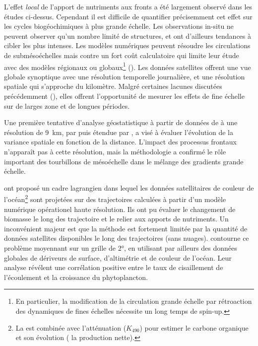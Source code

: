 
L'effet \emph{local} de l'apport de nutriments aux fronts a été largement observé dans les études ci-dessus.
Cependant il est difficile de quantifier précisemment cet effet sur les cycles biogéochimiques à plus grande échelle.
Les observations in-situ ne peuvent observer qu'un nombre limité de structures, et ont d'ailleurs tendances à cibler les plus intenses.
Les modèles numériques peuvent résoudre les circulations de submésoéchelles mais contre un fort coût calculatoire qui limite leur étude avec des modèles régionaux ou globaux\footnote{%
  En particulier, la modification de la circulation grande échelle par rétroaction des dynamiques de fines échelles nécessite un long temps de spin-up.
} (\cite{kessouri_2020,hewitt_2022}).
Les données satellites offrent une vue globale synoptique avec une résolution temporelle journalière, et une résolution spatiale qui s'approche du kilomètre.
Malgré certaines lacunes discutées précédemment (), elles offrent l'opportunité de mesurer les effets de fine échelle sur de larges zone et de longues périodes.

Une première tentative d'analyse géostatistique à partir de données de  à une résolution de \qty{9}{\km}, par \textcite{doney_2003} puis étendue par \textcite{glover_2018}, a visé à évaluer l'évolution de la variance spatiale en fonction de la distance.
L'impact des processus frontaux n'apparaît pas à cette résolution, mais la méthodologie a confirmé le rôle important des tourbillons de mésoéchelle dans le mélange des gradients grande échelle.

\Textcite{jonsson_2011} ont proposé un cadre lagrangien dans lequel les données satellitaires de couleur de l'océan\footnote{%
  La  est combinée avec l'atténuation (\(K_{490}\)) pour estimer le carbone organique et son évolution ( la production nette).
} sont projetées sur des trajectoires calculées à partir d'un modèle numérique opérationel haute résolution.
Ils ont pu évaluer le changement de biomasse le long des trajectoire et le relier aux apports de nutriments.
Un inconvénient majeur est que la méthode est fortement limitée par la quantité de données satellites disponibles le long des trajectoires (sans nuages).
\Textcite{zhang_2019} contourne ce problème moyennant sur un grille de \ang{2}, en utilisant par ailleurs des données globales de dériveurs de surface, d'altimétrie et de couleur de l'océan.
Leur analyse révélent une corrélation positive entre le taux de cisaillement de l'écoulement et la croissance du phytoplancton.

